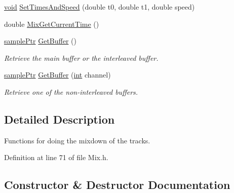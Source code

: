 \begin{DoxyCompactItemize}
\item 
\hyperlink{sound_8c_ae35f5844602719cf66324f4de2a658b3}{void} \hyperlink{class_mixer_a088b0e80e5435a4a1b48f7f7758fb8bf}{Set\+Times\+And\+Speed} (double t0, double t1, double speed)
\item 
double \hyperlink{class_mixer_ada8ba062d87b6d980b3e2246ec0dded5}{Mix\+Get\+Current\+Time} ()
\item 
\hyperlink{include_2audacity_2_types_8h_aaafb46d1caf7c79262fec96b577215fe}{sample\+Ptr} \hyperlink{class_mixer_a8c97ad5e9ae660d85dc10e3ccb528a4f}{Get\+Buffer} ()
\begin{DoxyCompactList}\small\item\em Retrieve the main buffer or the interleaved buffer. \end{DoxyCompactList}\item 
\hyperlink{include_2audacity_2_types_8h_aaafb46d1caf7c79262fec96b577215fe}{sample\+Ptr} \hyperlink{class_mixer_ad62d5795af0ecac54e73bd037ca91972}{Get\+Buffer} (\hyperlink{xmltok_8h_a5a0d4a5641ce434f1d23533f2b2e6653}{int} channel)
\begin{DoxyCompactList}\small\item\em Retrieve one of the non-\/interleaved buffers. \end{DoxyCompactList}\end{DoxyCompactItemize}


\subsection{Detailed Description}
Functions for doing the mixdown of the tracks. 

Definition at line 71 of file Mix.\+h.



\subsection{Constructor \& Destructor Documentation}

